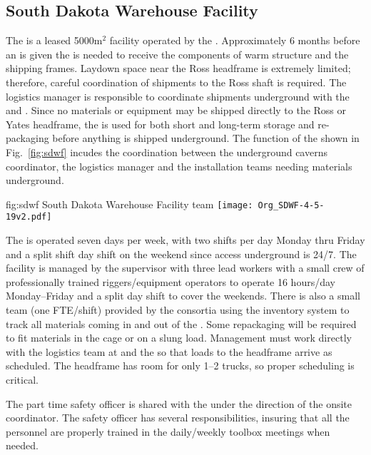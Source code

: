 \subsection{South Dakota Warehouse Facility}

The  is a leased 5000m$^2$ facility operated by the
.  Approximately 6 months before an  is given
the  is needed to receive the components of warm structure
and the  shipping frames. Laydown space near the Ross
headframe is extremely limited; therefore, careful coordination of
shipments to the Ross shaft is required. The  logistics
manager is responsible to coordinate shipments underground with the
 and . Since no materials or equipment may be
shipped directly to the Ross or Yates headframe, the  is
used for both short and long-term storage and re-packaging before
anything is shipped underground. The function of the 
shown in Fig.~\ref{fig:sdwf} incudes the coordination between the
underground caverns coordinator, the logistics manager and the
installation teams needing materials underground.
\begin{dunefigure}{fig:sdwf}
  {South Dakota Warehouse Facility team}
  \texttt{[image: Org\_SDWF-4-5-19v2.pdf]}
\end{dunefigure}

The  is operated seven days per week, with two shifts per
day Monday thru Friday and a split shift day shift on the weekend
since access underground is 24/7. The facility is managed by the
 supervisor with three lead workers with a small
 crew of professionally trained riggers/equipment operators
to operate 16 hours/day Monday--Friday and a split day shift to cover
the weekends.  There is also a small team (one FTE/shift) provided by
the consortia using the inventory system to track all materials coming
in and out of the . Some repackaging will be required to
fit materials in the cage or on a slung load.  Management must work
directly with the  logistics team at  and the
 so that loads to the headframe arrive as scheduled. The
headframe has room for only 1--2 trucks, so proper scheduling is
critical.

The part time safety officer is shared with the  under the
direction of the onsite  coordinator.  The safety officer
has several responsibilities, insuring that all the 
personnel are properly trained in the daily/weekly toolbox meetings
when needed.

